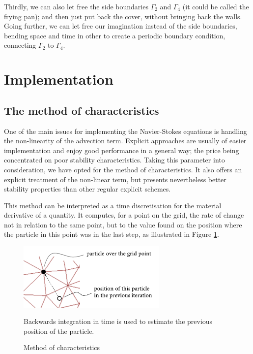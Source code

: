 \documentclass[12pt,oneside]{article}
\begin{document}
Thirdly, we can also let free the side boundaries $\Gamma_2$ and $\Gamma_4$ (it could be called the frying pan); and then just put back the cover, without bringing back the walls. Going further, we can let free our imagination instead of the side boundaries, bending space and time in other to create a periodic boundary condition, connecting $\Gamma_2$ to $\Gamma_4$.




\section{Implementation}

\subsection{The method of characteristics}
One of the main issues for implementing the Navier-Stokes equations is handling the non-linearity of the advection term. Explicit approaches are usually of easier implementation and enjoy good performance in a general way; the price being concentrated on poor stability characteristics. Taking this parameter into consideration, we have opted for the method of characteristics. It also offers an explicit treatment of the non-linear term, but presents nevertheless better stability properties than other regular explicit schemes.

This method can be interpreted as a time discretisation for the material derivative of a quantity. It computes, for a point on the grid, the rate of change not in relation to the same point, but to the value found on the position where the particle in this point was in the last step, as illustrated in Figure \ref{fig:charac}.

\begin{figure}[ht]
 \centering
 \includegraphics[width=0.65\textwidth]{charac}
 \caption{Method of characteristics}
 \footnotesize{Backwards integration in time is used to estimate the previous position of the particle.}
 \label{fig:charac}
\end{figure}
\end{document}
